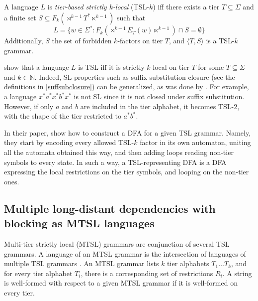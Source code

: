 \begin{definition}
A language $L$ is \emph{tier-based strictly $k$-local} (TSL-$k$) iff there exists a tier $T \subseteq \Sigma$ and a finite set $S \subseteq F_k(\rtimes^{k-1} T^* \ltimes^{k-1})$ such that
\[
L = \{ w \in \Sigma^* :   F_k(\rtimes^{k-1} E_T(w) \ltimes^{k-1})  \cap S = \emptyset \}
\]
Additionally, $S$ the set of forbidden $k$-factors on tier $T$, and $\langle T, S\rangle$ is a TSL-$k$ grammar.
\end{definition}

\cite{DeSantoGraf19FG} show that a language $L$ is TSL iff it is strictly $k$-local on tier $T$ for some $T \subseteq \Sigma$ and $k \in \mathbb{N}$.
Indeed, SL properties such as suffix substitution closure (see the definitions in \ref{suffsubclosure}) can be generalized, as was done by \cite{LambertRogers2020}.
For example, a language $x^*a^*x^*b^*x^*$ is not SL since it is not closed under suffix substitution.
However, if only $a$ and $b$ are included in the tier alphabet, it becomes TSL-$2$, with the shape of the tier restricted to $a^*b^*$. 



In their paper, \cite{LambertRogers2020} show how to construct a DFA for a given TSL grammar.
Namely, they start by encoding every allowed TSL-$k$ factor in its own automaton, uniting all the automata obtained this way, and then adding loops reading non-tier symbols to every state.
In such a way, a TSL-representing DFA is a DFA expressing the local restrictions on the tier symbols, and looping on the non-tier ones.







\subsection{Multiple long-distant dependencies with blocking as MTSL languages}

Multi-tier strictly local (MTSL) grammars are conjunction of several TSL grammars.
A language of an MTSL grammar is the intersection of languages of multiple TSL grammars \citep{DeSantoGraf19FG}.
An MTSL grammar lists $k$ tier alphabets $T_1 \dots T_k$, and for every tier alphabet $T_i$, there is a corresponding set of restrictions $R_i$.
A string is well-formed with respect to a given MTSL grammar if it is well-formed on every tier.



